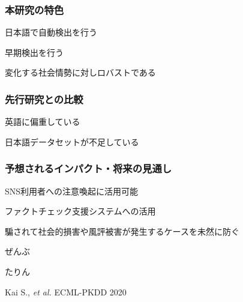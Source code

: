 
\subsubsection*{本研究の特色}
日本語で自動検出を行う

早期検出を行う

変化する社会情勢に対しロバストである

\subsubsection*{先行研究との比較}
英語に偏重している

日本語データセットが不足している

\subsubsection*{予想されるインパクト・将来の見通し}
SNS利用者への注意喚起に活用可能

ファクトチェック支援システムへの活用

騙されて社会的損害や風評被害が発生するケースを未然に防ぐ


ぜんぶ

たりん

\vspace{1cm}
{\footnotesize 
\begin{twobibliography}{99}
    \setlength{\parskip}{0cm}
    \setlength{\itemsep}{0cm}
     Kai S., \textit{et al.} ECML-PKDD 2020
\end{twobibliography}
}


